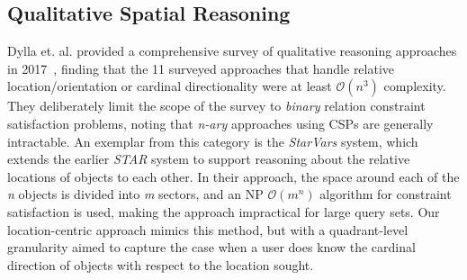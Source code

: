 \subsection{Qualitative Spatial Reasoning}
\par{Dylla et. al. provided a comprehensive survey of qualitative reasoning approaches in 2017~\cite{Dylla2017}, finding that the 11 surveyed approaches that handle relative location/orientation or cardinal directionality were at least $\mathcal{O}(n^3)$ complexity. 
They deliberately limit the scope of the survey to \textit{binary} relation constraint satisfaction problems, noting that \textit{n-ary} approaches using CSPs are generally intractable.
An exemplar from this category is the \textit{StarVars} system, which extends the earlier \textit{STAR} system to support reasoning about the relative locations of objects to each other.
In their approach, the space around each of the \textit{n} objects is divided into \textit{m} sectors, and an NP $\mathcal{O}(m^n)$ algorithm for constraint satisfaction is used, making the approach impractical for large query sets.
Our location-centric approach mimics this method, but with a quadrant-level granularity aimed to capture the case when a user does know the cardinal direction of objects with respect to the location sought.}

%
